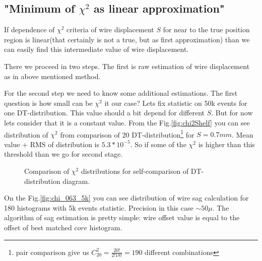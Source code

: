 	

	\subsection{"Minimum of $\chi^2$ as linear approximation"}
	
	If dependence of $\chi^2$ criteria of wire displacement $S$ for near to the true position region is linear(that certainly is not a true, but as first approximation) than we can easily find this intermediate value of wire displacement.
	
	There we proceed in two steps. The first is raw estimation of wire displacement as in above mentioned method.
	
	For the second step we need to know some additional estimations.	The first question is how small can be  $\chi^2$ it our case? Lets fix statistic on 50k events for one DT-distribution. This value should a bit depend for different $S$. But for now lets consider that it is a constant value. From the Fig.\ref{fig:chi2Shelf} you can see distribution of $\chi^2$ from comparison of 20 DT-distribution\footnote{pair comparison give us $C_{20}^2 = \frac{20!}{2!18!}=190$ different combinations}  for $S=0.7mm$. Mean value + RMS of distribution is $ 5.3*10^{-5}$. So if some of the $\chi^2$ is higher than this threshold than we go for second stage.
	
	
	\begin{figure}[h!]
		\centering
		\qquad
		\caption{Comparison of $\chi^2$ distributions for self-comparison of DT-distribution diagram.} 
	\end{figure}	
	
	On the Fig.\ref{fig:chi_063_5k} you can see distribution of wire sag calculation for 180 histograms with 5k events statistic. Precision in this case  $\sim 50\mu$. The algorithm of sag estimation is pretty simple: wire offset value is equal to the offset  of best matched  $core$ histogram.

